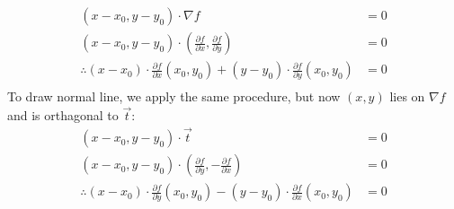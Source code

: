 \begin{itemize}
\begin{theorem}
\begin{align*}
			\left( x-x_0,y-y_0 \right) \cdot \nabla f &=  0 \\
			\left( x-x_0,y-y_0 \right) \cdot \left( \frac{\partial f}{\partial x} , \frac{\partial f}{\partial y}  \right) &= 0 \\
			\therefore \left( x-x_0 \right) \cdot \frac{\partial f }{\partial x} \left( x_0,y_0 \right) +\left( y-y_0 \right) \cdot \frac{\partial f}{\partial y} \left( x_0,y_0 \right) &= 0 \\
		\end{align*}
		To draw normal line, we apply the same procedure, but now $\left( x,y \right) $ lies on $\nabla f$ and is orthagonal to $\vec{t}$:
		\begin{align*}
			\left( x-x_0,y-y_0 \right) \cdot \vec{t} &=  0 \\
			\left( x-x_0,y-y_0 \right) \cdot \left( \frac{\partial f}{\partial y} , -\frac{\partial f}{\partial x}  \right) &= 0 \\
			\therefore \left( x-x_0 \right) \cdot \frac{\partial f }{\partial y} \left( x_0,y_0 \right) -\left( y-y_0 \right) \cdot \frac{\partial f}{\partial x} \left( x_0,y_0 \right) &= 0 \\
		\end{align*}
	\end{theorem}

\end{itemize}
